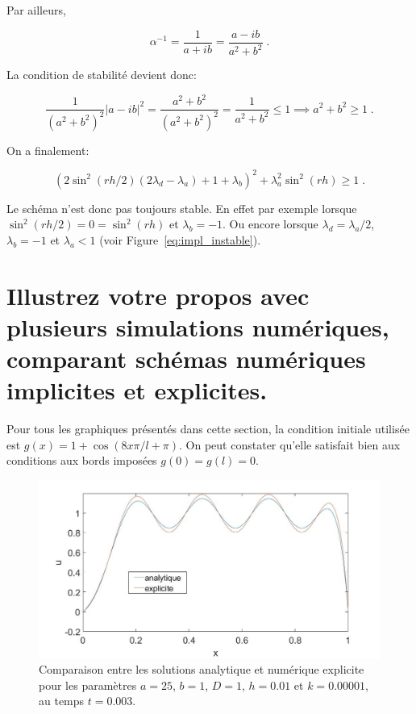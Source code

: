\documentclass[a4paper, 12pt]{report}
\begin{document}
Par ailleurs,

\begin{equation}
\alpha^{-1} = \frac{1}{a+ib} = \frac{a-ib}{a^2+b^2}\;.
\end{equation}

La condition de stabilité devient donc:

\begin{equation}
 \frac{1}{(a^2+b^2)^2}|a-ib|^2 = \frac{a^2+b^2}{(a^2+b^2)^2} = \frac{1}{a^2+b^2}  \le 1 \implies a^2+b^2 \ge 1\;.
\end{equation}

On a finalement:

\begin{equation}
\boxed{\left ( 2 \sin^2(rh/2) (2 \lambda_d - \lambda_a) +1 + \lambda_b \right )^2 + \lambda_a^2 \sin^2(rh) \ge 1}\;.
\end{equation}

Le schéma n'est donc pas toujours stable. En effet par exemple lorsque
$\sin^2(rh/2) = 0 = \sin^2(rh)$ et $\lambda_b = -1$. Ou encore lorsque
$\lambda_d = \lambda_a/2$, $\lambda_b = -1$ et $\lambda_a < 1$ (voir Figure~\ref{eq:impl_instable}).

\section{Illustrez votre propos avec plusieurs simulations numériques, comparant schémas numériques implicites et explicites.}

Pour tous les graphiques présentés dans cette section, la condition initiale
utilisée est $g(x) = 1+\cos(8x \pi /l+ \pi )$. On peut constater qu'elle satisfait
bien aux conditions aux bords imposées $g(0) = g(l) = 0$.

\begin{figure}[H]
  \center
  \includegraphics[scale=0.4]{images/analy_vs_expl_t_end_0dot003.jpg}
  \caption{Comparaison entre les solutions analytique et numérique explicite pour
  les paramètres $a=25$, $b=1$, $D=1$, $h=0.01$ et $k=0.00001$, au temps $t=0.003$.}
\end{figure}
\end{document}

